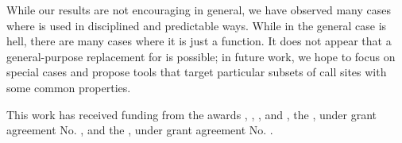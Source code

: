 \documentclass[acmsmall, screen]{acmart}
\begin{document}
While our results are not encouraging in general, we have observed many cases
where \eval is used in disciplined and predictable ways. While in the general
case \eval is hell, there are many cases where it is just a function. It does
not appear that a general-purpose replacement for \eval is possible; in future
work, we hope to focus on special cases and propose tools that target particular
subsets of call sites with some common properties.


\begin{acks}
  This work has received funding from the
 awards
, ,
, and , the
, under grant agreement No.
, and the
, under
grant agreement No.  .
\end{acks}



\end{document}
